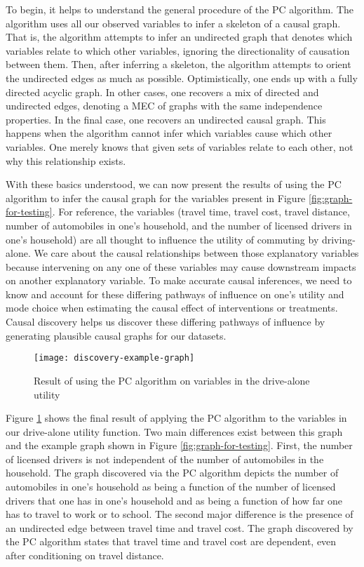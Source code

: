 To begin, it helps to understand the general procedure of the PC algorithm. The algorithm uses all our observed variables to infer a skeleton of a causal graph.
That is, the algorithm attempts to infer an undirected graph that denotes which variables relate to which other variables, ignoring the directionality of causation between them.
Then, after inferring a skeleton, the algorithm attempts to orient the undirected edges as much as possible.
Optimistically, one ends up with a fully directed acyclic graph.
In other cases, one recovers a mix of directed and undirected edges, denoting a MEC of graphs with the same independence properties.
In the final case, one recovers an undirected causal graph.
This happens when the algorithm cannot infer which variables cause which other variables.
One merely knows that given sets of variables relate to each other, not why this relationship exists.

With these basics understood, we can now present the results of using the PC algorithm to infer the causal graph for the variables present in Figure \ref{fig:graph-for-testing}.
For reference, the variables (travel time, travel cost, travel distance, number of automobiles in one's household, and the number of licensed drivers in one's household) are all thought to influence the utility of commuting by driving-alone.
We care about the causal relationships between those explanatory variables because intervening on any one of these variables may cause downstream impacts on another explanatory variable.
To make accurate causal inferences, we need to know and account for these differing pathways of influence on one's utility and mode choice when estimating the causal effect of interventions or treatments.
Causal discovery helps us discover these differing pathways of influence by generating plausible causal graphs for our datasets.

\begin{figure}
   \centering
   \texttt{[image: discovery-example-graph]}
   \caption{Result of using the PC algorithm on variables in the drive-alone utility}
   \label{fig:discovery-example-graph}
\end{figure}

Figure \ref{fig:discovery-example-graph} shows the final result of applying the PC algorithm to the variables in our drive-alone utility function.
Two main differences exist between this graph and the example graph shown in Figure \ref{fig:graph-for-testing}.
First, the number of licensed drivers is not independent of the number of automobiles in the household.
The graph discovered via the PC algorithm depicts the number of automobiles in one's household as being a function of the number of licensed drivers that one has in one's household and as being a function of how far one has to travel to work or to school.
The second major difference is the presence of an undirected edge between travel time and travel cost.
The graph discovered by the PC algorithm states that travel time and travel cost are dependent, even after conditioning on travel distance.

